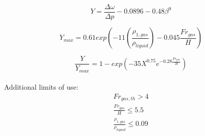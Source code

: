 \documentclass[journal]{IEEEtran}
\begin{document}
\begin{equation}
\label{eq:11583_Y}
    Y = \frac{\Delta \omega}{\Delta p} - 0.0896 -0.48 \beta^{9}
\end{equation}

\begin{equation}
\label{eq:11583_Ymax}
    Y_{max} = 0.61 exp \left( -11 \left( \frac{\rho_{1,gas}}{\rho_{liquid}} \right) - 0.045 \frac{Fr_{gas}}{H} \right)
\end{equation}

\begin{equation}
\label{eq:11583_Y/Ymax}
    \frac{Y}{Y_{max}} = 1 - exp \left(-35 X^{0.75} e^{-0.28 \frac{Fr_{gas}}{H}} \right)
\end{equation}
\\
Additional limits of use: \\
\begin{equation*}
\begin{aligned}
    Fr_{gas,th} > 4 \\
    \frac{Fr_{gas}}{H} \leq 5.5 \\
    \frac{\rho_{1,gas}}{\rho_{liquid}} \leq 0.09
\end{aligned}
\end{equation*}












 

% 
\end{document}
